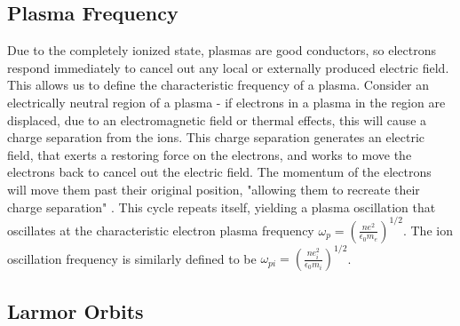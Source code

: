 \documentclass{article}
\begin{document}
\subsection{Plasma Frequency}

 Due to the completely ionized state, plasmas are good conductors, so electrons respond immediately to cancel out any local or externally produced electric field. This allows us to define the characteristic frequency of a plasma. Consider an electrically neutral region of a plasma -  if electrons in a plasma in the region are displaced, due to an electromagnetic field or thermal effects, this will cause a charge separation from the ions. This charge separation generates an electric field, that exerts a restoring force on the electrons, and works to move the electrons back to cancel out the electric field. The momentum of the electrons will move them past their original position, "allowing them to recreate their charge separation" \cite{Wesson}. This cycle repeats itself, yielding a plasma oscillation that oscillates at the characteristic electron plasma frequency $\omega_p = (\frac{ne^2}{\epsilon_0 m_e})^{1/2}$. The ion oscillation frequency is similarly defined to be $\omega_{pi} =  (\frac{ne_i^2}{\epsilon_0 m_i})^{1/2}$. \\


\subsection{Larmor Orbits}
\end{document}
